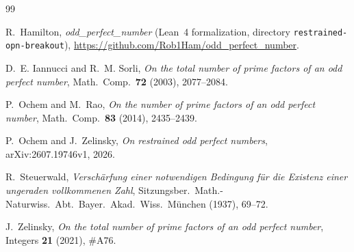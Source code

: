 \documentclass[11pt]{amsart}
\theoremstyle{definition}
\theoremstyle{remark}
\begin{document}
\begin{thebibliography}{99}

R.~Hamilton, \emph{odd\_perfect\_number} (Lean~4 formalization, directory \texttt{restrained-opn-breakout}), \url{https://github.com/Rob1Ham/odd_perfect_number}.

D.~E. Iannucci and R.~M. Sorli, \emph{On the total number of prime factors of an odd perfect number}, Math.\ Comp.\ \textbf{72} (2003), 2077--2084.

P.~Ochem and M.~Rao, \emph{On the number of prime factors of an odd perfect number}, Math.\ Comp.\ \textbf{83} (2014), 2435--2439.

P.~Ochem and J.~Zelinsky, \emph{On restrained odd perfect numbers}, arXiv:2607.19746v1, 2026.

R.~Steuerwald, \emph{Versch\"arfung einer notwendigen Bedingung f\"ur die Existenz einer ungeraden vollkommenen Zahl}, Sitzungsber.\ Math.-Naturwiss.\ Abt.\ Bayer.\ Akad.\ Wiss.\ M\"unchen (1937), 69--72.

J.~Zelinsky, \emph{On the total number of prime factors of an odd perfect number}, Integers \textbf{21} (2021), \#A76.

\end{thebibliography}
\end{document}
